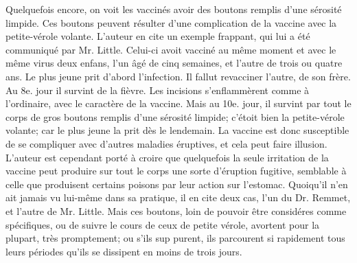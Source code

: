 Quelquefois encore, on voit les vaccinés avoir des boutons remplis d'une sérosité limpide. Ces boutons peuvent résulter d'une complication de la vaccine avec la petite-vérole volante. L'auteur en cite un exemple frappant, qui lui a été communiqué par Mr. Little. Celui-ci avoit vacciné au même moment et avec le même virus deux enfans, l'un âgé de cinq semaines, et l'autre de trois ou quatre ans. Le plus jeune prit d'abord l'infection. Il fallut revacciner l'autre, de son frère. Au 8e. jour il survint de la fièvre. Les incisions s'enflammèrent comme à l'ordinaire, avec le caractère de la vaccine. Mais au 10e. jour, il survint par tout le corps de gros boutons remplis d'une sérosité limpide; c'étoit bien la petite-vérole volante; car le plus jeune la prit dès le lendemain. La vaccine est donc susceptible de se compliquer avec d'autres maladies éruptives, et cela peut faire illusion.
L'auteur est cependant porté à croire que quelquefois la seule irritation de la vaccine peut produire sur tout le corps une sorte d'éruption fugitive, semblable à celle que produisent certains poisons par leur action sur l'estomac. Quoiqu'il n'en ait jamais vu lui-même dans sa pratique, il en cite deux cas, l'un du Dr. Remmet, et l'autre de Mr. Little. Mais ces boutons, loin de pouvoir être considéres\setcounter{page}{382} comme spécifiques, ou de suivre le cours de ceux de petite vérole, avortent pour la plupart, très promptement; ou s'ils sup purent, ils parcourent si rapidement tous leurs périodes qu'ils se dissipent en moins de trois jours.
